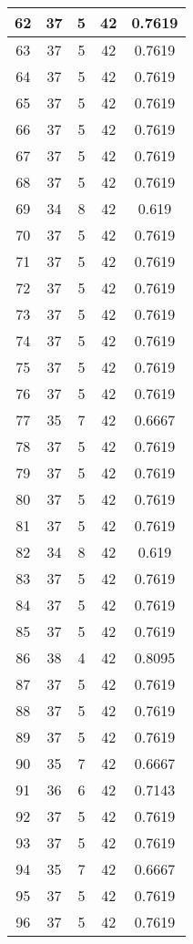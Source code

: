 \documentclass[letterpaper, 12pt]{article}
\begin{document}
\begin{longtable}{|c|c|c|c|c|}
\hline
62 & 37 & 5 & 42 & 0.7619 \\
\hline
63 & 37 & 5 & 42 & 0.7619 \\
\hline
64 & 37 & 5 & 42 & 0.7619 \\
\hline
65 & 37 & 5 & 42 & 0.7619 \\
\hline
66 & 37 & 5 & 42 & 0.7619 \\
\hline
67 & 37 & 5 & 42 & 0.7619 \\
\hline
68 & 37 & 5 & 42 & 0.7619 \\
\hline
69 & 34 & 8 & 42 & 0.619 \\
\hline
70 & 37 & 5 & 42 & 0.7619 \\
\hline
71 & 37 & 5 & 42 & 0.7619 \\
\hline
72 & 37 & 5 & 42 & 0.7619 \\
\hline
73 & 37 & 5 & 42 & 0.7619 \\
\hline
74 & 37 & 5 & 42 & 0.7619 \\
\hline
75 & 37 & 5 & 42 & 0.7619 \\
\hline
76 & 37 & 5 & 42 & 0.7619 \\
\hline
77 & 35 & 7 & 42 & 0.6667 \\
\hline
78 & 37 & 5 & 42 & 0.7619 \\
\hline
79 & 37 & 5 & 42 & 0.7619 \\
\hline
80 & 37 & 5 & 42 & 0.7619 \\
\hline
81 & 37 & 5 & 42 & 0.7619 \\
\hline
82 & 34 & 8 & 42 & 0.619 \\
\hline
83 & 37 & 5 & 42 & 0.7619 \\
\hline
84 & 37 & 5 & 42 & 0.7619 \\
\hline
85 & 37 & 5 & 42 & 0.7619 \\
\hline
86 & 38 & 4 & 42 & 0.8095 \\
\hline
87 & 37 & 5 & 42 & 0.7619 \\
\hline
88 & 37 & 5 & 42 & 0.7619 \\
\hline
89 & 37 & 5 & 42 & 0.7619 \\
\hline
90 & 35 & 7 & 42 & 0.6667 \\
\hline
91 & 36 & 6 & 42 & 0.7143 \\
\hline
92 & 37 & 5 & 42 & 0.7619 \\
\hline
93 & 37 & 5 & 42 & 0.7619 \\
\hline
94 & 35 & 7 & 42 & 0.6667 \\
\hline
95 & 37 & 5 & 42 & 0.7619 \\
\hline
96 & 37 & 5 & 42 & 0.7619 \\

\end{longtable}
\end{document}
